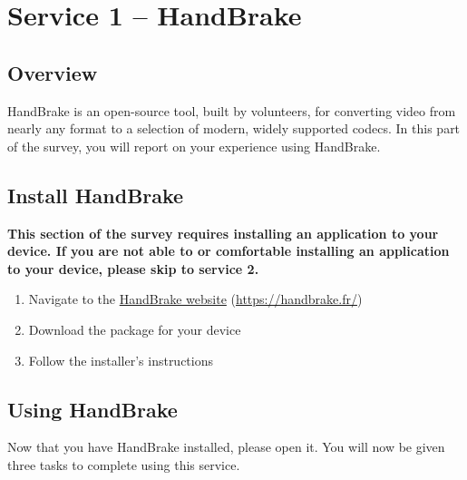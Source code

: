 \section{Service 1 – HandBrake}
\subsection{Overview}
HandBrake is an open-source tool, built by volunteers, for converting video from nearly any format to a selection of modern, widely supported codecs. In this part of the survey, you will report on your experience using HandBrake.

\subsection{Install HandBrake}


\begin{warningbox}
\textbf{This section of the survey requires installing an application to your device. If you are not able to or comfortable installing an application to your device, please skip to service 2.}
\end{warningbox}

\begin{enumerate}
    \item Navigate to the \href{https://handbrake.fr/}{HandBrake website} (\url{https://handbrake.fr/})
    \item Download the package for your device
    \item Follow the installer's instructions
\end{enumerate}

\clearpage


\subsection{Using HandBrake}

Now that you have HandBrake installed, please open it. You will now be given three tasks to complete using this service.
\clearpage

\clearpage

\clearpage
